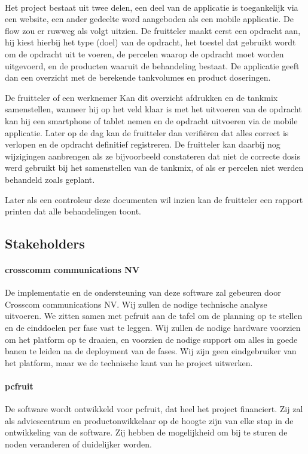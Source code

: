 \paragraph {} Het project bestaat uit twee delen, een deel van de applicatie is
toegankelijk via een website, een ander gedeelte word aangeboden als een mobile
applicatie. De flow zou er ruwweg als volgt uitzien. De fruitteler maakt eerst een
opdracht aan, hij kiest hierbij het type (doel) van de opdracht, het toestel dat gebruikt
wordt om de opdracht uit te voeren, de percelen waarop de opdracht moet worden
uitgevoerd, en de producten waaruit de behandeling bestaat. De applicatie geeft dan een
overzicht met de berekende tankvolumes en product doseringen.

De fruitteler of een werknemer Kan dit overzicht afdrukken en de tankmix samenstellen,
wanneer hij op het veld klaar is met het uitvoeren van de opdracht kan hij een smartphone
of tablet nemen en de opdracht uitvoeren via de mobile applicatie. Later op de dag kan de
fruitteler dan verifi\"eren dat alles correct is verlopen en de opdracht definitief
registreren. De fruitteler kan daarbij nog wijzigingen aanbrengen als ze bijvoorbeeld
constateren dat niet de correcte dosis werd gebruikt bij het samenstellen van de tankmix,
of als er percelen niet werden behandeld zoals geplant.

Later als een controleur deze documenten wil inzien kan de fruitteler een rapport printen
dat alle behandelingen toont.


\subsection {Stakeholders}

\paragraph {crosscomm communications NV} De implementatie en de ondersteuning van deze
software zal gebeuren door Crosscom communications NV. Wij zullen de nodige technische
analyse uitvoeren. We zitten samen met pcfruit aan de tafel om de planning op te stellen
en de einddoelen per fase vast te leggen. Wij zullen de nodige hardware voorzien om het
platform op te draaien, en voorzien de nodige support om alles in goede banen te leiden na
de deployment van de fases. Wij zijn geen eindgebruiker van het platform, maar we de
technische kant van he project uitwerken.

\paragraph {pcfruit} De software wordt ontwikkeld voor pcfruit, dat heel het project
financiert. Zij zal als adviescentrum en productonwikkelaar op de hoogte zijn van elke
stap in de ontwikkeling van de software. Zij hebben de mogelijkheid om bij te sturen
de noden veranderen of duidelijker worden.

